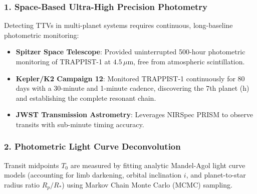 \documentclass[11pt,a4paper]{article}
\begin{document}
\subsubsection*{1. Space-Based Ultra-High Precision Photometry}
Detecting TTVs in multi-planet systems requires continuous, long-baseline photometric monitoring:
\begin{itemize}
    \item \textbf{Spitzer Space Telescope}: Provided uninterrupted 500-hour photometric monitoring of TRAPPIST-1 at $4.5\,\mu\text{m}$, free from atmospheric scintillation.
    \item \textbf{Kepler/K2 Campaign 12}: Monitored TRAPPIST-1 continuously for 80 days with a 30-minute and 1-minute cadence, discovering the 7th planet (h) and establishing the complete resonant chain.
    \item \textbf{JWST Transmission Astrometry}: Leverages NIRSpec PRISM to observe transits with sub-minute timing accuracy.
\end{itemize}

\subsubsection*{2. Photometric Light Curve Deconvolution}
Transit midpoints $T_0$ are measured by fitting analytic Mandel-Agol light curve models (accounting for limb darkening, orbital inclination $i$, and planet-to-star radius ratio $R_p/R_*$) using Markov Chain Monte Carlo (MCMC) sampling.
\end{document}
